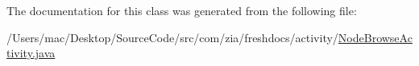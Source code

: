 The documentation for this class was generated from the following file\-:\begin{DoxyCompactItemize}
\item 
/\-Users/mac/\-Desktop/\-Source\-Code/src/com/zia/freshdocs/activity/\hyperlink{_node_browse_activity_8java}{Node\-Browse\-Activity.\-java}\end{DoxyCompactItemize}
